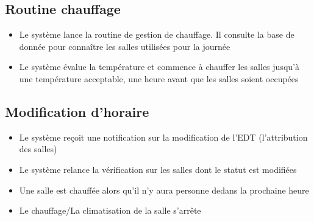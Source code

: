 \subsection*{Routine chauffage}
\begin{itemize}
\item Le système lance la routine de gestion de chauffage. Il consulte la base de donnée pour connaître les salles utilisées pour la journée 
\item Le système évalue la température et commence à chauffer les salles jusqu’à une température acceptable, une heure avant que les salles soient occupées 
\end{itemize}

\subsection*{Modification d’horaire}
\begin{itemize}
\item Le système reçoit une notification sur la modification de l’EDT (l’attribution des salles) 
\item Le système relance la vérification sur les salles dont le statut est modifiées 
\item Une salle est chauffée alors qu’il n’y aura personne dedans la prochaine heure 
\item Le chauffage/La climatisation de la salle s’arrête 
\end{itemize}
